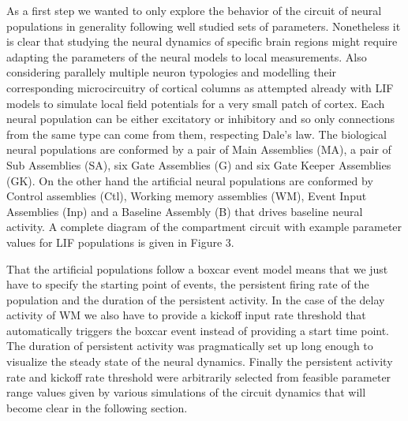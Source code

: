 \documentclass[10pt]{article}
\begin{document}
{As a first step we wanted to only explore the behavior of the circuit of neural populations in generality following well studied sets of parameters.
Nonetheless it is clear that studying the neural dynamics of specific brain regions might require adapting the parameters of the neural models to local measurements.
Also considering parallely multiple neuron typologies and modelling their corresponding microcircuitry of cortical columns as attempted already with LIF models to simulate local field potentials for a very small patch of cortex\cite{Mazzoni_2015,Hagen_2015}.
Each neural population can be either excitatory or inhibitory and so only connections from the same type can come from them, respecting Dale's law.
The biological neural populations are conformed by a pair of Main Assemblies (MA), a pair of Sub Assemblies (SA), six Gate Assemblies (G) and six Gate Keeper Assemblies (GK).
On the other hand the artificial neural populations are conformed by Control assemblies (Ctl), Working memory assemblies (WM), Event Input Assemblies (Inp) and a Baseline Assembly (B) that drives baseline neural activity.
A complete diagram of the compartment circuit with example parameter values for LIF populations is given in Figure 3.

That the artificial populations follow a boxcar event model means that we just have to specify the starting point of events, the persistent firing rate of the population and the duration of the persistent activity.
In the case of the delay activity of WM we also have to provide a kickoff input rate threshold that automatically triggers the boxcar event instead of providing a start time point.
The duration of persistent activity was pragmatically set up long enough to visualize the steady state of the neural dynamics.
Finally the persistent activity rate and kickoff rate threshold were arbitrarily selected from feasible parameter range values given by various simulations of the circuit dynamics that will become clear in the following section.

}
\end{document}

